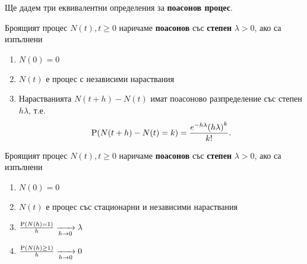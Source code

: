 \documentclass{../../common/topic}
\begin{document}
Ще дадем три еквивалентни определения за \textbf{поасонов процес}.

\begin{definition}\label{def:poisson_process/increments}
  Броящият процес \( N(t), t \geq 0 \) наричаме \textbf{поасонов} със \textbf{степен} \( \lambda > 0 \), ако са изпълнени
  \begin{enumerate}
    \item \( N(0) = 0 \)
    \item \( N(t) \) е процес с независими нараствания
    \item Нарастванията \( N(t+h)-N(t) \) имат поасоново разпределение със степен \( h\lambda \), т.е.
    \begin{equation*}
      \operatorname{P}(N(t+h)-N(t) = k)
      =
      \frac{e^{-h\lambda} {(h\lambda)}^k} {k!}.
    \end{equation*}
  \end{enumerate}
\end{definition}

\begin{definition}\label{def:poisson_process/limits}
  Броящият процес \( N(t), t \geq 0 \) наричаме \textbf{поасонов} със \textbf{степен} \( \lambda > 0 \), ако са изпълнени
  \begin{enumerate}
    \item \( N(0) = 0 \)
    \item \( N(t) \) е процес със стационарни и независими нараствания
    \item \( \frac {\operatorname{P}(N(h) = 1)} h \xrightarrow[h \to 0]{} \lambda \)
    \item \( \frac {\operatorname{P}(N(h) \geq 1)} h \xrightarrow[h \to 0]{} 0 \)
  \end{enumerate}
\end{definition}
\end{document}
